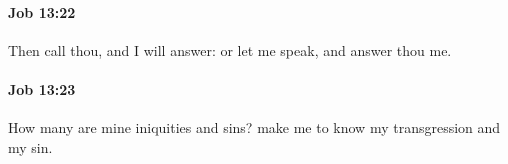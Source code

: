 		\paragraph{Job 13:22} %
			\label{JOB-13-22}

			Then call thou, and I will answer: or let me speak, and answer thou me.


		\paragraph{Job 13:23} %
			\label{JOB-13-23}

			How many are mine iniquities and sins? make me to know my transgression and my sin.



